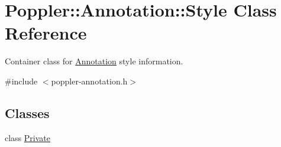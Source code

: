 \hypertarget{class_poppler_1_1_annotation_1_1_style}{}\section{Poppler\+:\+:Annotation\+:\+:Style Class Reference}
\label{class_poppler_1_1_annotation_1_1_style}


Container class for \hyperlink{class_poppler_1_1_annotation}{Annotation} style information.  




{\ttfamily \#include $<$poppler-\/annotation.\+h$>$}

\subsection*{Classes}
\begin{DoxyCompactItemize}
\item 
class \hyperlink{class_poppler_1_1_annotation_1_1_style_1_1_private}{Private}
\end{DoxyCompactItemize}
